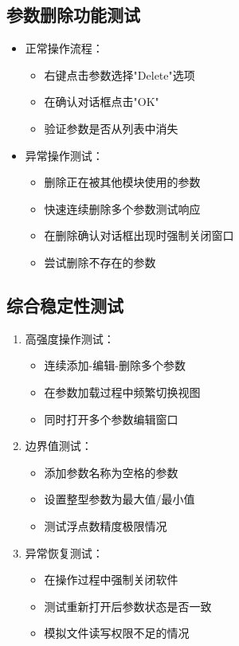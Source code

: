 \documentclass[a4paper,12pt]{report}	%
\begin{document}
\subsection{参数删除功能测试}
\begin{itemize}
    \item 正常操作流程：
    \begin{itemize}
        \item 右键点击参数选择"Delete"选项
        \item 在确认对话框点击"OK"
        \item 验证参数是否从列表中消失
    \end{itemize}
    
    \item 异常操作测试：
    \begin{itemize}
        \item 删除正在被其他模块使用的参数
        \item 快速连续删除多个参数测试响应
        \item 在删除确认对话框出现时强制关闭窗口
        \item 尝试删除不存在的参数
    \end{itemize}
\end{itemize}

\subsection{综合稳定性测试}
\begin{enumerate}
    \item 高强度操作测试：
    \begin{itemize}
        \item 连续添加-编辑-删除多个参数
        \item 在参数加载过程中频繁切换视图
        \item 同时打开多个参数编辑窗口
    \end{itemize}
    
    \item 边界值测试：
    \begin{itemize}
        \item 添加参数名称为空格的参数
        \item 设置整型参数为最大值/最小值
        \item 测试浮点数精度极限情况
    \end{itemize}
    
    \item 异常恢复测试：
    \begin{itemize}
        \item 在操作过程中强制关闭软件
        \item 测试重新打开后参数状态是否一致
        \item 模拟文件读写权限不足的情况
    \end{itemize}
\end{enumerate}
\end{document}
